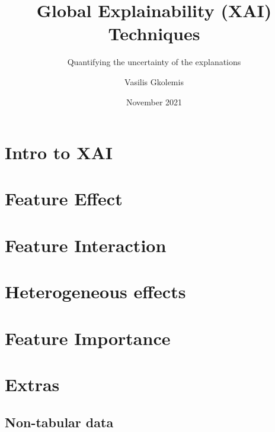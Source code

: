 \documentclass{beamer}
\title[FUB-Presentation]{Global Explainability (XAI) Techniques}
\subtitle{Quantifying the uncertainty of the explanations}
\author[Gkolemis, Vasilis] %
{Vasilis Gkolemis\inst{1}}
\institute[VFU] %
{
  \inst{1}%
  ATHENA Research and Innovation Center
}
\date{November 2021}
\begin{document}
\frame{\titlepage}

\section{Intro to XAI}
% 

\section{Feature Effect}
% 

\section{Feature Interaction}


\section{Heterogeneous effects}



\section{Feature Importance}
% 

\section{Extras}
\subsection{Non-tabular data}
\end{document}
